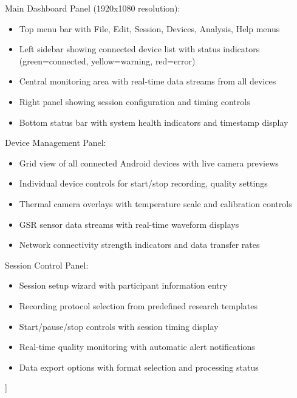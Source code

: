 \documentclass[11pt,a4paper]{report}
\begin{document}
Main Dashboard Panel (1920x1080 resolution):
\begin{itemize}
\item Top menu bar with File, Edit, Session, Devices, Analysis, Help menus
\item Left sidebar showing connected device list with status indicators (green=connected, yellow=warning, red=error)
\item Central monitoring area with real-time data streams from all devices
\item Right panel showing session configuration and timing controls
\item Bottom status bar with system health indicators and timestamp display

\end{itemize}
Device Management Panel:
\begin{itemize}
\item Grid view of all connected Android devices with live camera previews
\item Individual device controls for start/stop recording, quality settings
\item Thermal camera overlays with temperature scale and calibration controls
\item GSR sensor data streams with real-time waveform displays
\item Network connectivity strength indicators and data transfer rates

\end{itemize}
Session Control Panel:
\begin{itemize}
\item Session setup wizard with participant information entry
\item Recording protocol selection from predefined research templates
\item Start/pause/stop controls with session timing display
\item Real-time quality monitoring with automatic alert notifications
\item Data export options with format selection and processing status
\end{itemize}
]
\end{document}
